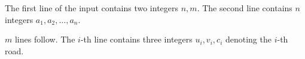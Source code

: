 The first line of the input contains two integers $n,m$.
The second line contains $n$ integers $a_1,a_2,\ldots,a_n$.

$m$ lines follow.
The $i$-th line contains three integers $u_i,v_i,c_i$ denoting the $i$-th road.